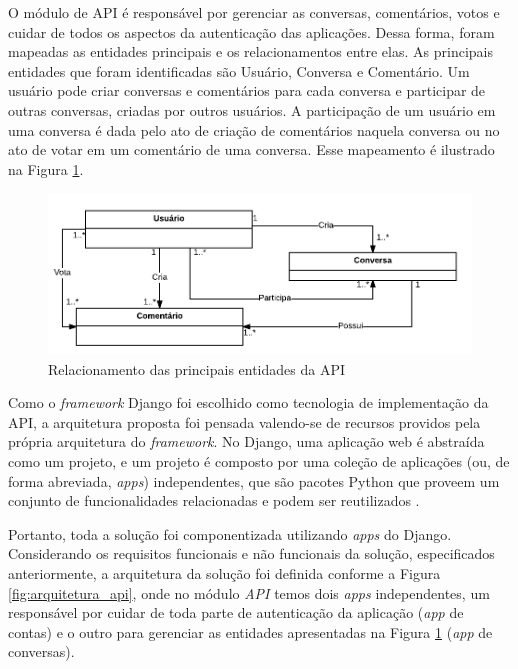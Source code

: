 	O módulo de API é responsável por gerenciar as conversas, comentários, votos
	e cuidar de todos os aspectos da autenticação das aplicações. Dessa forma, foram mapeadas as entidades principais e 
	os relacionamentos entre elas. 
	As principais entidades que foram identificadas são Usuário, Conversa e Comentário. Um usuário pode criar
	conversas e comentários para cada conversa e participar de outras conversas, criadas por outros usuários.
	A participação de um usuário em uma conversa é dada pelo ato de criação de comentários naquela conversa ou
	no ato de votar em um comentário de uma conversa. Esse mapeamento é ilustrado na Figura \ref{fig:entidades}.

	\begin{figure}[h!]
	\centering
	\includegraphics[scale=0.5]{figuras/entidades.png}
	\caption{Relacionamento das principais entidades da API}
	\label{fig:entidades}
	\end{figure}

	Como o \textit{framework} Django foi escolhido como tecnologia de implementação da API,
	a arquitetura proposta foi pensada valendo-se de 
	recursos providos pela própria arquitetura do \textit{framework}.
	No Django, uma aplicação web é abstraída como um projeto, e um projeto é composto por uma coleção de aplicações
	(ou, de forma abreviada, \textit{apps}) independentes, que
	são pacotes Python que proveem um conjunto de funcionalidades relacionadas e podem ser reutilizados \cite{django_apps}.

	Portanto, toda a solução foi componentizada utilizando \textit{apps} do 
	Django. Considerando os requisitos funcionais e não funcionais da solução, especificados anteriormente, a arquitetura da solução foi definida 
	conforme a Figura \ref{fig:arquitetura_api}, onde no módulo \textit{API} temos dois \textit{apps} independentes, um responsável
	por cuidar de toda parte de autenticação da aplicação (\textit{app} de contas) e o outro para gerenciar as entidades apresentadas na
	Figura \ref{fig:entidades} (\textit{app} de conversas). 

